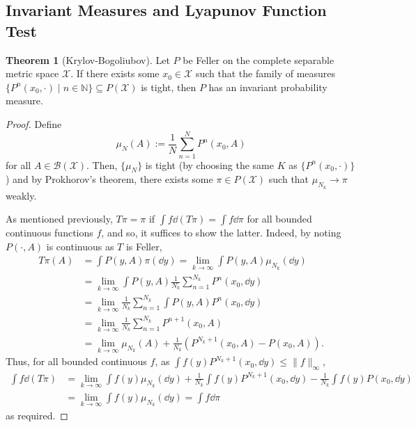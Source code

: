 \documentclass[]{article}
\theoremstyle{definition}
\newtheorem{theorem}{Theorem}
\theoremstyle{definition}
\begin{document}
\subsection{Invariant Measures and Lyapunov Function Test}

\begin{theorem}[Krylov-Bogoliubov]
  Let \(P\) be Feller on the complete separable metric space \(\mathcal{X}\). 
  If there exists some \(x_0 \in \mathcal{X}\) such that the family of measures
  \(\{P^n(x_0, \cdot) \mid n \in \mathbb{N}\} \subseteq P(\mathcal{X})\) is 
  tight, then \(P\) has an invariant probability measure.
\end{theorem}
\begin{proof}
  Define 
  \[\mu_N(A) := \frac{1}{N} \sum_{n = 1}^N P^n(x_0, A)\]
  for all \(A \in \mathcal{B}(\mathcal{X})\). Then, \(\{\mu_N\}\) is tight 
  (by choosing the same \(K\) as \(\{P^n(x_0, \cdot)\}\))
  and by Prokhorov's theorem, there exists some \(\pi \in P(\mathcal{X})\) 
  such that \(\mu_{N_k} \to \pi\) weakly.

  As mentioned previously, \(T\pi = \pi\) if \(\int f \dd(T\pi) = \int f \dd \pi\) 
  for all bounded continuous functions \(f\), and so, it suffices to show the latter.
  Indeed, by noting \(P(\cdot, A)\) is continuous as \(T\) is Feller, 
  \[\begin{split}
    T\pi(A) & = \int P(y, A) \pi(\dd y) = \lim_{k \to \infty} \int P(y, A) \mu_{N_k}(\dd y)\\
    & = \lim_{k \to \infty} \int P(y, A) \frac{1}{N_k} \sum_{n = 1}^{N_k} P^n(x_0, \dd y)\\
    & = \lim_{k \to \infty} \frac{1}{N_k} \sum_{n = 1}^{N_k} \int P(y, A) P^n(x_0, \dd y)\\
    & = \lim_{k \to \infty} \frac{1}{N_k} \sum_{n = 1}^{N_k}P^{n + 1}(x_0, A)\\
    & = \lim_{k \to \infty} \mu_{N_k}(A) + \frac{1}{N_k}(P^{N_k + 1}(x_0, A) - P(x_0, A)).
  \end{split}\]
  Thus, for all bounded continuous \(f\), as 
  \(\int f(y) P^{N_k + 1}(x_0, \dd y) \le \|f\|_\infty\), 
  \[\begin{split}
    \int f \dd(T\pi) & = 
    \lim_{k \to \infty} \int f(y) \mu_{N_k}(\dd y) 
    + \frac{1}{N_k} \int f(y) P^{N_k + 1}(x_0, \dd y) 
    - \frac{1}{N_k} \int f(y) P(x_0, \dd y)\\
    & = \lim_{k \to \infty} \int f(y) \mu_{N_k}(\dd y) = \int f \dd \pi
  \end{split}\]
  as required.
\end{proof}
\end{document}
